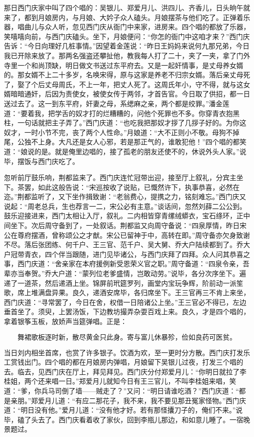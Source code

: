 那日西门庆家中叫了四个唱的：吴银儿、郑爱月儿、洪四儿、齐香儿，日头晌午就来了，都到月娘房内，与月娘、大妗子众人磕头。月娘摆茶与他们吃了。正弹着乐器，唱曲儿与众人听，忽见西门庆从衙门中来家，进房来。四个唱的都放了乐器，笑嘻嘻向前，与西门庆磕头。坐下，月娘便问：“你怎的衙门中这咱才来？”西门庆告诉：“今日向理好几桩事情。”因望着金莲说：“昨日王妈妈来说何九那兄弟，今日我已开除来放了。那两名强盗还攀扯他，教我每人打了二十，夹了一夹，拿了门外寺里一个和尚顶缺，明日做文书送过东平府去。又是一起奸情事，是丈母养女婿的。那女婿不上二十多岁，名唤宋得，原与这家是养老不归宗女婿。落后亲丈母死了，娶了个后丈母周氏，不上一年，把丈人死了。这周氏年小，守不得，就与这女婿暗暗通奸，后因为责使女，被使女传于两邻，才首告官。今日取了供招，都一日送过去了。这一到东平府，奸妻之母，系缌麻之亲，两个都是绞罪。”潘金莲道：“要着我，把学舌的奴才打的烂糟糟的，问他个死罪也不多。你穿青衣抱黑柱，一句话就把主子弄了。”西门庆道：“也吃我把那奴才拶了几拶子好的。为你这奴才，一时小节不完，丧了两个人性命。”月娘道：“大不正则小不敬。母狗不掉尾，公独不上身。大凡还是女人心邪，若是那正气的，谁敢犯他！”四个唱的都笑道：“娘说的是。就是俺里边唱的，接了孤老的朋友还使不的，休说外头人家。”说毕，摆饭与西门庆吃了。

忽听前厅鼓乐响，荆都监来了。西门庆连忙冠带出迎，接至厅上叙礼，分宾主坐下。茶罢，如此这般告说：“宋巡按收了说贴，已慨然许下，执事恭喜，必然在迩。”荆都监听了，又下坐作揖致谢：“老翁费心，提携之力，铭刻难忘。”西门庆又说起：“周老总兵，生也荐言一二，宋公必有主意。”谈话间，忽然刘薛二公公到。鼓乐迎接进来，西门太相让入厅，叙礼。二内相皆穿青缧绒蟒衣，宝石绦环，正中间坐下。次后周守备到了，一处叙话。荆都监又向周守备说：“四泉厚情，昨日宋公在尊府摆酒，曾称颂公之才猷。宋公已留神于中，高转在即。”周守备亦欠身致谢不尽。落后张团练、何千户、王三官、范千户、吴大舅、乔大户陆续都到了。乔大户冠带青衣，四个伴当跟随，进门见毕诸公，与西门庆拜了四拜。众人问其恭喜之事，西门庆道：“舍亲家在本府援例新受恩荣义官之职。”周守备道：“四泉令亲，吾辈亦当奉贺。”乔大户道：“蒙列位老爹盛情，岂敢动劳。”说毕，各分次序坐下。遍递了一道茶，然后递酒上坐。锦屏前玳筵罗列，画堂内宝玩争辉，阶前动一派笙歌，席上堆满盘异果。良久，递酒安席毕，各归席坐下。王三官再三不肯上来坐，西门庆道：“寻常罢了，今日在舍，权借一日陪诸公上坐。”王三官必不得已，左边垂首坐了。须臾，上罢汤饭，下边教坊撮弄杂耍百戏上来。良久，才是四个唱的，拿着银筝玉板，放娇声当筵弹唱。正是：

\[
舞裙歌板逐时新，散尽黄金只此身。
寄与富儿休暴殄，俭如良药可医贫。
\]

当日刘内相坐首席，也赏了许多银子。饮酒为欢，至一更时分方散。西门庆打发乐工赏钱出门。四个唱的都在月娘房内弹唱，月娘留下吴银儿过夜，打发三个唱的去。临去，见西门庆在厅上，拜见拜见。西门庆分付郑爱月儿：“你明日就拉了李桂姐，两个还来唱一日。”郑爱月儿就知今日有王三官儿，不叫李桂姐来唱，笑道：“爹，你兵马司倒了墙——贼走了？”又问：“明日请谁吃酒？”西门庆道：“都是亲朋。”郑爱月儿道：“有应二那花子，我不来，我不要见那丑冤家怪物。”西门庆道：“明日没有他。”爱月儿道：“没有他才好。若有那怪攮刀子的，俺们不来。”说毕，磕了头去了。西门庆看着收了家伙，回到李瓶儿那边，和如意儿睡了。一宿晚景题过。

